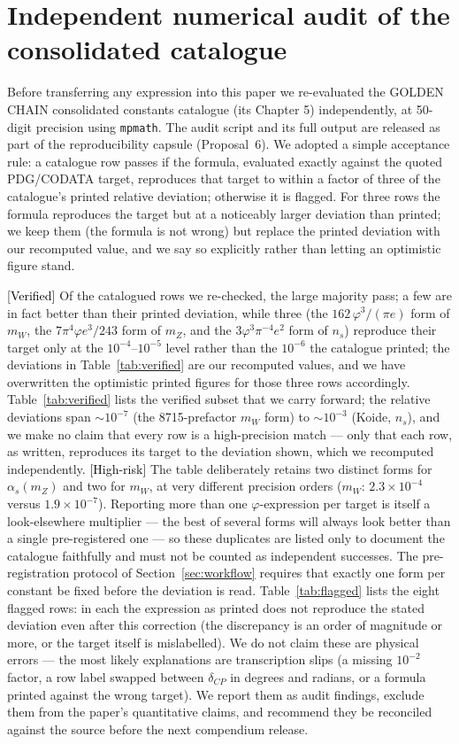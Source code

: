 \documentclass[11pt]{article}
\newcommand{\Verified}{\textcolor{black}{[Verified]}}
\newcommand{\Risk}{\textcolor{black}{[High-risk]}}
\newcommand{\phigr}{\varphi}
\begin{document}
\section{Independent numerical audit of the consolidated catalogue}\label{sec:audit}
Before transferring any expression into this paper we re-evaluated the GOLDEN CHAIN consolidated constants catalogue (its Chapter 5) independently, at 50-digit precision using \texttt{mpmath}. The audit script and its full output are released as part of the reproducibility capsule (Proposal~6). We adopted a simple acceptance rule: a catalogue row passes if the formula, evaluated exactly against the quoted PDG/CODATA target, reproduces that target to within a factor of three of the catalogue's printed relative deviation; otherwise it is flagged. For three rows the formula reproduces the target but at a noticeably larger deviation than printed; we keep them (the formula is not wrong) but replace the printed deviation with our recomputed value, and we say so explicitly rather than letting an optimistic figure stand.

\Verified{} Of the catalogued rows we re-checked, the large majority pass; a few are in fact better than their printed deviation, while three (the $162\,\phigr^3/(\pi e)$ form of $m_W$, the $7\pi^4\phigr e^3/243$ form of $m_Z$, and the $3\phigr^3\pi^{-4}e^2$ form of $n_s$) reproduce their target only at the $10^{-4}$--$10^{-5}$ level rather than the $10^{-6}$ the catalogue printed; the deviations in Table~\ref{tab:verified} are our recomputed values, and we have overwritten the optimistic printed figures for those three rows accordingly. Table~\ref{tab:verified} lists the verified subset that we carry forward; the relative deviations span $\sim 10^{-7}$ (the 8715-prefactor $m_W$ form) to $\sim 10^{-3}$ (Koide, $n_s$), and we make no claim that every row is a high-precision match --- only that each row, as written, reproduces its target to the deviation shown, which we recomputed independently. \Risk{} The table deliberately retains two distinct forms for $\alpha_s(m_Z)$ and two for $m_W$, at very different precision orders ($m_W$: $2.3 \times 10^{-4}$ versus $1.9 \times 10^{-7}$). Reporting more than one $\phigr$-expression per target is itself a look-elsewhere multiplier --- the best of several forms will always look better than a single pre-registered one --- so these duplicates are listed only to document the catalogue faithfully and must not be counted as independent successes. The pre-registration protocol of Section~\ref{sec:workflow} requires that exactly one form per constant be fixed before the deviation is read. Table~\ref{tab:flagged} lists the eight flagged rows: in each the expression as printed does not reproduce the stated deviation even after this correction (the discrepancy is an order of magnitude or more, or the target itself is mislabelled). We do not claim these are physical errors --- the most likely explanations are transcription slips (a missing $10^{-2}$ factor, a row label swapped between $\delta_{CP}$ in degrees and radians, or a formula printed against the wrong target). We report them as audit findings, exclude them from the paper's quantitative claims, and recommend they be reconciled against the source before the next compendium release.
\end{document}
